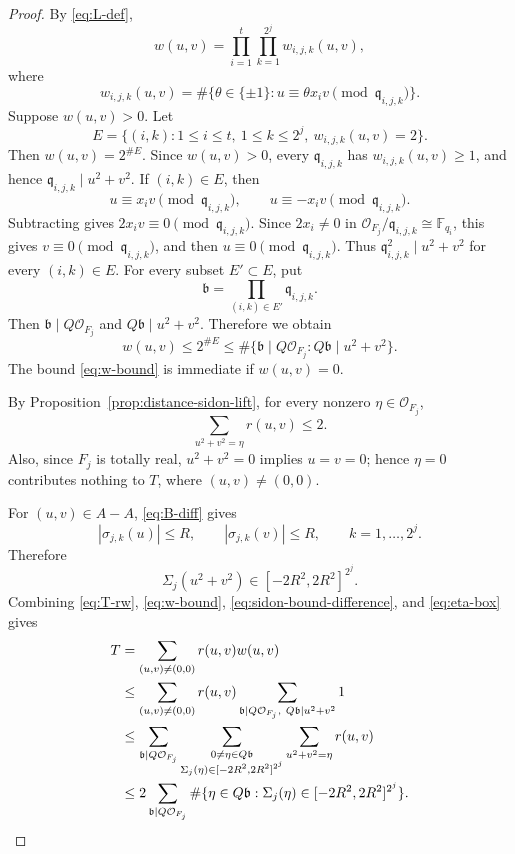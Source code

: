 \begin{proof}
By \eqref{eq:L-def},
\[
w(u,v)
=
\prod_{i=1}^t\prod_{k=1}^{2^j}w_{i,j,k}(u,v),
\]
where
\[
w_{i,j,k}(u,v)
=
\#\{\theta\in\{\pm1\}:u\equiv\theta x_i v\pmod{\mathfrak q_{i,j,k}}\}.
\]
Suppose \(w(u,v)>0\).
Let
\[
E=
\{(i,k):1\le i\le t,\ 1\le k\le 2^j,\ w_{i,j,k}(u,v)=2\}.
\]
Then \(w(u,v)=2^{\#E}\).
Since \(w(u,v)>0\), every \(\mathfrak q_{i,j,k}\) has \(w_{i,j,k}(u,v)\ge1\), and hence \(\mathfrak q_{i,j,k}\mid u^2+v^2\).
If \((i,k)\in E\), then
\[
u\equiv x_i v\pmod{\mathfrak q_{i,j,k}},
\qquad
u\equiv -x_i v\pmod{\mathfrak q_{i,j,k}}.
\]
Subtracting gives \(2x_i v\equiv0\pmod{\mathfrak q_{i,j,k}}\).
Since \(2x_i\ne0\) in \(\mathcal O_{F_j}/\mathfrak q_{i,j,k}\cong\mathbb F_{q_i}\), this gives \(v\equiv0\pmod{\mathfrak q_{i,j,k}}\), and then \(u\equiv0\pmod{\mathfrak q_{i,j,k}}\).
Thus \(\mathfrak q_{i,j,k}^2\mid u^2+v^2\) for every \((i,k)\in E\).
For every subset \(E'\subset E\), put
\[
\mathfrak b=\prod_{(i,k)\in E'}\mathfrak q_{i,j,k}.
\]
Then \(\mathfrak b\mid Q\mathcal O_{F_j}\) and \(Q\mathfrak b\mid u^2+v^2\).
Therefore we obtain
\begin{equation}\label{eq:w-bound}
w(u,v)
\le
2^{\#E}
\le
\#\{\mathfrak b\mid Q\mathcal O_{F_j} : Q\mathfrak b\mid u^2+v^2\}.
\end{equation}
The bound \eqref{eq:w-bound} is immediate if \(w(u,v)=0\).

By Proposition~\ref{prop:distance-sidon-lift}, for every nonzero \(\eta\in\mathcal O_{F_j}\),
\begin{equation}\label{eq:sidon-bound-difference}
\sum_{u^2+v^2=\eta} r(u,v)\le2.
\end{equation}
Also, since \(F_j\) is totally real, \(u^2+v^2=0\) implies \(u=v=0\); hence \(\eta=0\) contributes nothing to \(T\), where \((u,v)\ne(0,0)\).

For \((u,v)\in A-A\), \eqref{eq:B-diff} gives
\[
|\sigma_{j,k}(u)|\le R,
\qquad
|\sigma_{j,k}(v)|\le R,
\qquad
k=1,\ldots,2^j.
\]
Therefore
\begin{equation}\label{eq:eta-box}
\Sigma_j(u^2+v^2)\in[-2R^2,2R^2]^{2^j}.
\end{equation}
Combining \eqref{eq:T-rw}, \eqref{eq:w-bound}, \eqref{eq:sidon-bound-difference}, and \eqref{eq:eta-box} gives
\begin{align}
T
&=
\sum_{(u,v)\ne(0,0)} r(u,v)w(u,v)
\notag\\
&\le
\sum_{(u,v)\ne(0,0)} r(u,v)
\sum_{\mathfrak b\mid Q\mathcal O_{F_j},\ Q\mathfrak b\mid u^2+v^2}1
\notag\\
&\le
\sum_{\mathfrak b\mid Q\mathcal O_{F_j}}
\sum_{\substack{0\ne\eta\in Q\mathfrak b\\
\Sigma_j(\eta)\in[-2R^2,2R^2]^{2^j}}}
\sum_{u^2+v^2=\eta}r(u,v)
\notag\\
&\le
2\sum_{\mathfrak b\mid Q\mathcal O_{F_j}}
\#\{\eta\in Q\mathfrak b:\Sigma_j(\eta)\in[-2R^2,2R^2]^{2^j}\}.
\label{eq:T-upper-prebox}
\end{align}


\end{proof}
